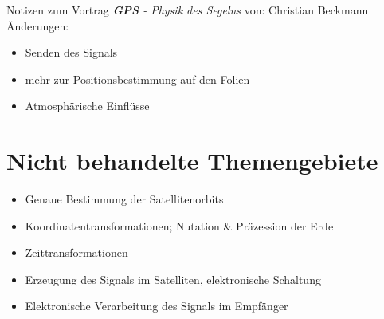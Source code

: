 
\newcommand{\ch}{$\checkmark$}

    {\huge Notizen zum Vortrag \textit{\textbf{GPS} - Physik des Segelns}}
    von: Christian Beckmann
    \tableofcontents
    Änderungen:
    \begin{itemize}
        \item Senden des Signals
        \item mehr zur Positionsbestimmung auf den Folien
        \item Atmosphärische Einflüsse
    \end{itemize}
    
    \newpage
    
    
    
    
    
    

    \section{Nicht behandelte Themengebiete}
    \begin{itemize}
        \item Genaue Bestimmung der Satellitenorbits
        \item Koordinatentransformationen; Nutation \& Präzession der Erde
        \item Zeittransformationen
        \item Erzeugung des Signals im Satelliten, elektronische Schaltung
        \item Elektronische Verarbeitung des Signals im Empfänger
    \end{itemize}
    \nocite{*}
    \printbibliography

